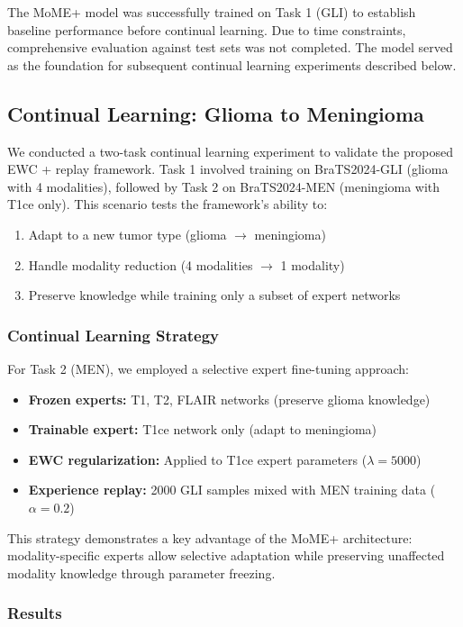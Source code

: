 \documentclass[conference]{IEEEtran}
\begin{document}
The MoME+ model was successfully trained on Task 1 (GLI) to establish baseline performance before continual learning. Due to time constraints, comprehensive evaluation against test sets was not completed. The model served as the foundation for subsequent continual learning experiments described below.

\subsection{Continual Learning: Glioma to Meningioma}

We conducted a two-task continual learning experiment to validate the proposed EWC + replay framework. Task 1 involved training on BraTS2024-GLI (glioma with 4 modalities), followed by Task 2 on BraTS2024-MEN (meningioma with T1ce only). This scenario tests the framework's ability to:

\begin{enumerate}
\item Adapt to a new tumor type (glioma $\to$ meningioma)
\item Handle modality reduction (4 modalities $\to$ 1 modality)
\item Preserve knowledge while training only a subset of expert networks
\end{enumerate}

\subsubsection{Continual Learning Strategy}

For Task 2 (MEN), we employed a selective expert fine-tuning approach:
\begin{itemize}
\item \textbf{Frozen experts:} T1, T2, FLAIR networks (preserve glioma knowledge)
\item \textbf{Trainable expert:} T1ce network only (adapt to meningioma)
\item \textbf{EWC regularization:} Applied to T1ce expert parameters ($\lambda=5000$)
\item \textbf{Experience replay:} 2000 GLI samples mixed with MEN training data ($\alpha=0.2$)
\end{itemize}

This strategy demonstrates a key advantage of the MoME+ architecture: modality-specific experts allow selective adaptation while preserving unaffected modality knowledge through parameter freezing.

\subsubsection{Results}
\end{document}
